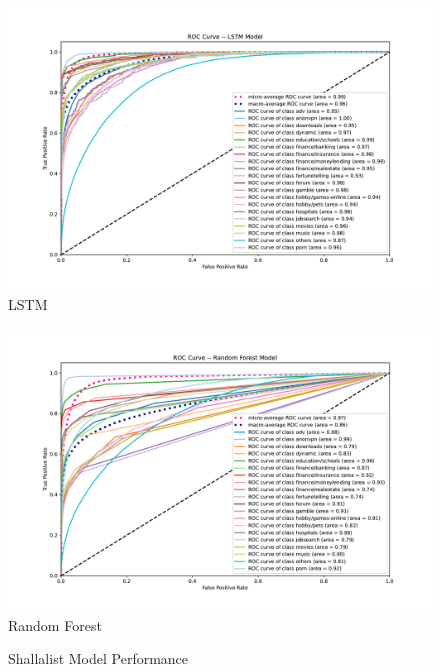 \documentclass[12pt, letterpaper]{article}
\begin{document}
\begin{figure}[!htb]
\centering
\caption{Shallalist Model Performance}\label{shalla_lstm_rf_svm}
	\begin{minipage}[b]{0.3\textwidth}
	\centering
	\label{toulouse_lstm}
	\includegraphics[width=\textwidth]{../figs/roc-shalla-2017-lstm.pdf}\\LSTM
	\end{minipage}
	\begin{minipage}[b]{0.3\textwidth}
	\centering
	\label{toulouse_rf}
	\includegraphics[width=\textwidth]{../figs/roc-shalla-2017-rf.pdf}\\Random Forest
	\end{minipage}
	\begin{minipage}[b]{0.3\textwidth}
	\centering
	\label{toulouse_rf}

\end{minipage}
\end{figure}
\end{document}
